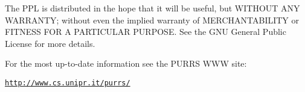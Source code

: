 \documentclass[a4paper]{article}
\begin{document}
The PPL is distributed in the hope that it will be useful, but WITHOUT
ANY WARRANTY; without even the implied warranty of MERCHANTABILITY or
FITNESS FOR A PARTICULAR PURPOSE.  See the GNU General Public License
for more details.

For the most up-to-date information see the PURRS WWW site:
\begin{center}
\href{http://www.cs.unipr.it/ppl/}{\tt http://www.cs.unipr.it/purrs/}
\end{center}

\tableofcontents
{}
\end{document}
